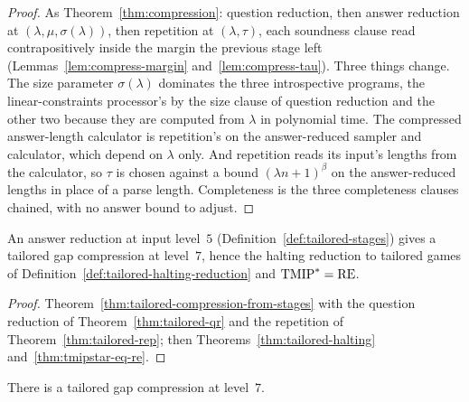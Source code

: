 \begin{proof}
\leanok
As Theorem~\ref{thm:compression}: question reduction, then answer reduction at $(\lambda, \mu,
\sigma(\lambda))$, then repetition at $(\lambda, \tau)$, each soundness clause read
contrapositively inside the margin the previous stage left (Lemmas~\ref{lem:compress-margin}
and~\ref{lem:compress-tau}). Three things change. The size parameter $\sigma(\lambda)$ dominates
the three introspective programs, the linear-constraints processor's by the size clause of
question reduction and the other two because they are computed from $\lambda$ in polynomial
time. The compressed answer-length calculator is repetition's on the answer-reduced sampler and
calculator, which depend on $\lambda$ only. And repetition reads its input's lengths from the
calculator, so $\tau$ is chosen against a bound $(\lambda n + 1)^\beta$ on the answer-reduced
lengths in place of a parse length. Completeness is the three completeness clauses chained,
with no answer bound to adjust.
\end{proof}

\begin{corollary}[$\mathrm{TMIP}^* = \RE$ from tailored answer reduction]
\label{cor:tmip-re-from-ar}
\leanok
An answer reduction at input level~$5$ (Definition~\ref{def:tailored-stages}) gives a tailored
gap compression at level~$7$, hence the halting reduction to tailored games of
Definition~\ref{def:tailored-halting-reduction} and $\mathrm{TMIP}^* = \RE$.
\end{corollary}

\begin{proof}
\leanok
Theorem~\ref{thm:tailored-compression-from-stages} with the question reduction of
Theorem~\ref{thm:tailored-qr} and the repetition of Theorem~\ref{thm:tailored-rep}; then
Theorems~\ref{thm:tailored-halting} and~\ref{thm:tmipstar-eq-re}.
\end{proof}

\begin{theorem}
\label{thm:tailored-compression-target}
\leanok
There is a tailored gap compression at level~$7$.
\end{theorem}

